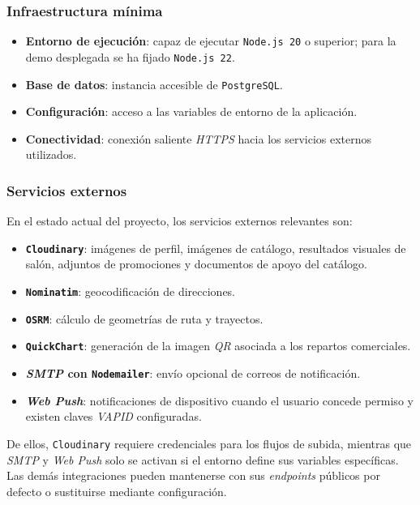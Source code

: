 \subsubsection*{Infraestructura mínima}

\begin{itemize}
    \item \textbf{Entorno de ejecución}: capaz de ejecutar \texttt{Node.js 20} o superior; para la demo desplegada se ha fijado \texttt{Node.js 22}.
    \item \textbf{Base de datos}: instancia accesible de \texttt{PostgreSQL}.
    \item \textbf{Configuración}: acceso a las variables de entorno de la aplicación.
    \item \textbf{Conectividad}: conexión saliente \textit{HTTPS} hacia los servicios externos utilizados.
\end{itemize}

\subsubsection*{Servicios externos}

En el estado actual del proyecto, los servicios externos relevantes son:

\begin{itemize}
    \item \textbf{\texttt{Cloudinary}}: imágenes de perfil, imágenes de catálogo, resultados visuales de salón, adjuntos de promociones y documentos de apoyo del catálogo.
    \item \textbf{\texttt{Nominatim}}: geocodificación de direcciones.
    \item \textbf{\texttt{OSRM}}: cálculo de geometrías de ruta y trayectos.
    \item \textbf{\texttt{QuickChart}}: generación de la imagen \textit{QR} asociada a los repartos comerciales.
    \item \textbf{\textit{SMTP} con \texttt{Nodemailer}}: envío opcional de correos de notificación.
    \item \textbf{\textit{Web Push}}: notificaciones de dispositivo cuando el usuario concede permiso y existen claves \textit{VAPID} configuradas.
\end{itemize}

De ellos, \texttt{Cloudinary} requiere credenciales para los flujos de subida, mientras que \textit{SMTP} y \textit{Web Push} solo se activan si el entorno define sus variables específicas. Las demás integraciones pueden mantenerse con sus \textit{endpoints} públicos por defecto o sustituirse mediante configuración.

